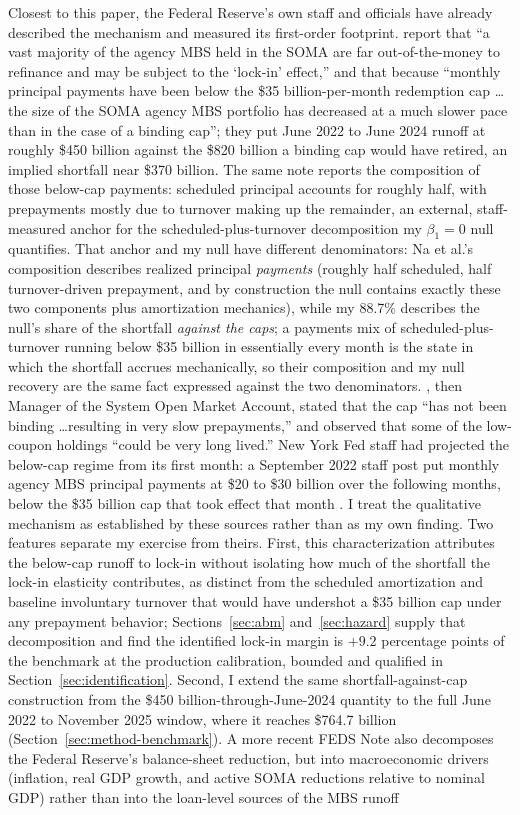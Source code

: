 \documentclass[12pt]{article}
\begin{document}
Closest to this paper, the Federal Reserve's own staff and officials have already described the mechanism and measured its first-order footprint. \citet{na2024} report that ``a vast majority of the agency MBS held in the SOMA are far out-of-the-money to refinance and may be subject to the `lock-in' effect,'' and that because ``monthly principal payments have been below the \$35 billion-per-month redemption cap \ldots the size of the SOMA agency MBS portfolio has decreased at a much slower pace than in the case of a binding cap''; they put June 2022 to June 2024 runoff at roughly \$450 billion against the \$820 billion a binding cap would have retired, an implied shortfall near \$370 billion. The same note reports the composition of those below-cap payments: scheduled principal accounts for roughly half, with prepayments mostly due to turnover making up the remainder, an external, staff-measured anchor for the scheduled-plus-turnover decomposition my $\beta_1 = 0$ null quantifies. That anchor and my null have different denominators: Na et al.'s composition describes realized principal \emph{payments} (roughly half scheduled, half turnover-driven prepayment, and by construction the null contains exactly these two components plus amortization mechanics), while my 88.7\% describes the null's share of the shortfall \emph{against the caps}; a payments mix of scheduled-plus-turnover running below \$35 billion in essentially every month is the state in which the shortfall accrues mechanically, so their composition and my null recovery are the same fact expressed against the two denominators. \citet{perli2024}, then Manager of the System Open Market Account, stated that the cap ``has not been binding \ldots resulting in very slow prepayments,'' and \citet{hammack2025} observed that some of the low-coupon holdings ``could be very long lived.'' New York Fed staff had projected the below-cap regime from its first month: a September 2022 staff post put monthly agency MBS principal payments at \$20 to \$30 billion over the following months, below the \$35 billion cap that took effect that month \citep{nyfed2022}. I treat the qualitative mechanism as established by these sources rather than as my own finding. Two features separate my exercise from theirs. First, this characterization attributes the below-cap runoff to lock-in without isolating how much of the shortfall the lock-in elasticity contributes, as distinct from the scheduled amortization and baseline involuntary turnover that would have undershot a \$35 billion cap under any prepayment behavior; Sections~\ref{sec:abm} and~\ref{sec:hazard} supply that decomposition and find the identified lock-in margin is $+9.2$ percentage points of the benchmark at the production calibration, bounded and qualified in Section~\ref{sec:identification}. Second, I extend the same shortfall-against-cap construction from the \$450 billion-through-June-2024 quantity to the full June 2022 to November 2025 window, where it reaches \$764.7 billion (Section~\ref{sec:method-benchmark}). A more recent \citet{eyal2026} FEDS Note also decomposes the Federal Reserve's balance-sheet reduction, but into macroeconomic drivers (inflation, real GDP growth, and active SOMA reductions relative to nominal GDP) rather than into the loan-level sources of the MBS runoff 
\end{document}
